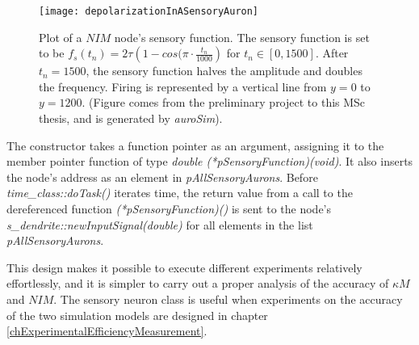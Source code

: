 \begin{figure}[htb!p]
	\centering
	\centerline{ %
	\texttt{[image: depolarizationInASensoryAuron]}
	}
	\caption[The depolarization of a sensory neuron given by a sinusoidal algebraic sensory function.]{
			Plot of a $NIM$ node's sensory function.
			The sensory function is set to be $f_s(t_n) = 2\tau\left(1-cos(\pi \cdot \frac{t_n}{1000}\right)$ for $t_n \in [0, 1500]$. After $t_n=1500$, the sensory function halves the amplitude and doubles the frequency.
			Firing is represented by a vertical line from $y=0$ to $y=1200$.
			(Figure comes from the preliminary project to this MSc thesis, and is generated by \emph{auroSim}).
			}
\end{figure}
			The constructor takes a function pointer as an argument, assigning it to the member pointer function of type \emph{double (*pSensoryFunction)(void)}. 
			It also inserts the node's address as an element in \emph{pAllSensoryAurons}.
			Before \emph{time\_class::doTask()} iterates time, the return value from a call to the dereferenced function \emph{(*pSensoryFunction)()} 
				is sent to the node's \emph{s\_dendrite::newInputSignal(double)} for all elements in the list \emph{pAllSensoryAurons}.

			This design makes it possible to execute different experiments relatively effortlessly, and it is simpler to carry out a proper analysis of the accuracy of $\kappa M$ and $NIM$.
			The sensory neuron class is useful when experiments on the accuracy of the two simulation models are designed in chapter \ref{chExperimentalEfficiencyMeasurement}.
			
